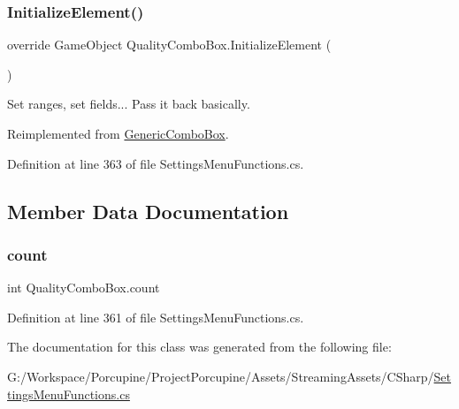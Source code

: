 \subsubsection{\texorpdfstring{Initialize\+Element()}{InitializeElement()}}
{\footnotesize\ttfamily override Game\+Object Quality\+Combo\+Box.\+Initialize\+Element (\begin{DoxyParamCaption}{ }\end{DoxyParamCaption})\hspace{0.3cm}{\ttfamily [virtual]}}



Set ranges, set fields... Pass it back basically. 



Reimplemented from \hyperlink{class_generic_combo_box_ae1800a7c68d3af046a2b147e117437ff}{Generic\+Combo\+Box}.



Definition at line 363 of file Settings\+Menu\+Functions.\+cs.



\subsection{Member Data Documentation}
\mbox{\label{class_quality_combo_box_abef900f73a92b47a08e22be563a58515}} 
\subsubsection{\texorpdfstring{count}{count}}
{\footnotesize\ttfamily int Quality\+Combo\+Box.\+count\hspace{0.3cm}{\ttfamily [protected]}}



Definition at line 361 of file Settings\+Menu\+Functions.\+cs.



The documentation for this class was generated from the following file\+:\begin{DoxyCompactItemize}
\item 
G\+:/\+Workspace/\+Porcupine/\+Project\+Porcupine/\+Assets/\+Streaming\+Assets/\+C\+Sharp/\hyperlink{_settings_menu_functions_8cs}{Settings\+Menu\+Functions.\+cs}\end{DoxyCompactItemize}

